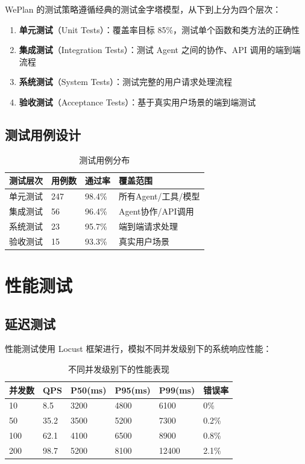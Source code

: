 \documentclass[12pt,a4paper]{ctexart}
\begin{document}
WePlan 的测试策略遵循经典的测试金字塔模型，从下到上分为四个层次：

\begin{enumerate}[leftmargin=2em]
  \item \textbf{单元测试}（Unit Tests）：覆盖率目标 85\%，测试单个函数和类方法的正确性
  \item \textbf{集成测试}（Integration Tests）：测试 Agent 之间的协作、API 调用的端到端流程
  \item \textbf{系统测试}（System Tests）：测试完整的用户请求处理流程
  \item \textbf{验收测试}（Acceptance Tests）：基于真实用户场景的端到端测试
\end{enumerate}

\subsection{测试用例设计}

\begin{table}[H]
\centering
\caption{测试用例分布}
\label{tab:test-cases}
\renewcommand{\arraystretch}{1.3}
\begin{tabular}{p{3cm} p{2cm} p{2cm} p{5cm}}
\toprule
\textbf{测试层次} & \textbf{用例数} & \textbf{通过率} & \textbf{覆盖范围} \\
\midrule
单元测试 & 247 & 98.4\% & 所有Agent/工具/模型 \\
集成测试 & 56 & 96.4\% & Agent协作/API调用 \\
系统测试 & 23 & 95.7\% & 端到端请求处理 \\
验收测试 & 15 & 93.3\% & 真实用户场景 \\
\bottomrule
\end{tabular}
\end{table}

\section{性能测试}

\subsection{延迟测试}

性能测试使用 Locust 框架进行，模拟不同并发级别下的系统响应性能：

\begin{table}[H]
\centering
\caption{不同并发级别下的性能表现}
\label{tab:perf-test}
\renewcommand{\arraystretch}{1.3}
\begin{tabular}{p{2cm} p{2cm} p{2cm} p{2cm} p{2cm} p{2cm}}
\toprule
\textbf{并发数} & \textbf{QPS} & \textbf{P50(ms)} & \textbf{P95(ms)} & \textbf{P99(ms)} & \textbf{错误率} \\
\midrule
10 & 8.5 & 3200 & 4800 & 6100 & 0\% \\
50 & 35.2 & 3500 & 5200 & 7300 & 0.2\% \\
100 & 62.1 & 4100 & 6500 & 8900 & 0.8\% \\
200 & 98.7 & 5200 & 8100 & 12400 & 2.1\% \\
\bottomrule
\end{tabular}
\end{table}
\end{document}
